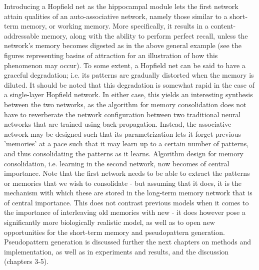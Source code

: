 Introducing a Hopfield net as the hippocampal module lets the first network attain qualities of an auto-associative network, namely those similar to a short-term memory, or working memory. More specifically, it results in a content-addressable memory, along with the ability to perform perfect recall, unless the network's memory becomes digested as in the above general example (see the figures representing basins of attraction for an illustration of how this phenomenon may occur).
To some extent, a Hopfield net can be said to have a graceful degradation; i.e. its patterns are gradually distorted when the memory is diluted. It should be noted that this degradation is somewhat rapid in the case of a single-layer Hopfield network. In either case, this yields an interesting synthesis between the two networks, as the algorithm for memory consolidation does not have to reverberate the network configuration between two traditional neural networks that are trained using back-propagation. Instead, the associative network may be designed such that its parametrization lets it forget previous 'memories' at a pace such that it may learn up to a certain number of patterns, and thus consolidating the patterns as it learns. Algorithm design for memory consolidation, i.e. learning in the second network, now becomes of central importance. Note that the first network needs to be able to extract the patterns or memories that we wish to consolidate - but assuming that it does, it is the mechanism with which these are stored in the long-term memory network that is of central importance. This does not contrast previous models when it comes to the importance of interleaving old memories with new - it does however pose a significantly more biologically realistic model, as well as to open new opportunities for the short-term memory and pseudopattern generation. Pseudopattern generation is discussed further the next chapters on methods and implementation, as well as in experiments and results, and the discussion (chapters 3-5).

